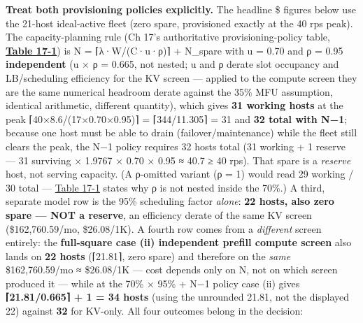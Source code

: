 \textbf{Treat both provisioning policies explicitly.} The headline \$
figures below use the 21-host ideal-active fleet (zero spare,
provisioned exactly at the 40 rps peak). The capacity-planning rule (Ch
17's authoritative provisioning-policy table, \textbf{\hyperref[tab:17.1]{Table 17-1}}) is N
= ⌈λ·W/(C·u·ρ)⌉ + N\_spare with u = 0.70 and ρ = 0.95
\textbf{independent} (u × ρ = 0.665, not nested; u and ρ derate slot
occupancy and LB/scheduling efficiency for the KV screen --- applied to
the compute screen they are the same numerical headroom derate against
the 35\% MFU assumption, identical arithmetic, different quantity),
which gives \textbf{31 working hosts} at the peak
⌈40×8.6/(17×0.70×0.95)⌉ = ⌈344/11.305⌉ = 31 and \textbf{32 total with
N−1}; because one host must be able to drain (failover/maintenance)
while the fleet still clears the peak, the N−1 policy requires 32 hosts
total (31 working + 1 reserve --- 31 surviving × 1.9767 × 0.70 × 0.95 ≈
40.7 ≥ 40 rps). That spare is a \emph{reserve} host, not serving
capacity. (A ρ-omitted variant (ρ = 1) would read 29 working / 30 total
--- \hyperref[tab:17.1]{Table 17-1} states why ρ is not nested inside the 70\%.) A third,
separate model row is the 95\% scheduling factor \emph{alone}:
\textbf{22 hosts, also zero spare --- NOT a reserve}, an efficiency
derate of the same KV screen (\$162,760.59/mo, \$26.08/1K). A fourth row
comes from a \emph{different} screen entirely: the \textbf{full-square
case (ii) independent prefill compute screen} also lands on \textbf{22
hosts} (⌈21.81⌉, zero spare) and therefore on the \emph{same}
\$162,760.59/mo ≈ \$26.08/1K --- cost depends only on N, not on which
screen produced it --- while at the 70\% × 95\% + N−1 policy case (ii)
gives \textbf{⌈21.81/0.665⌉ + 1 = 34 hosts} (using the unrounded 21.81,
not the displayed 22) against \textbf{32} for KV-only. All four outcomes
belong in the decision:

